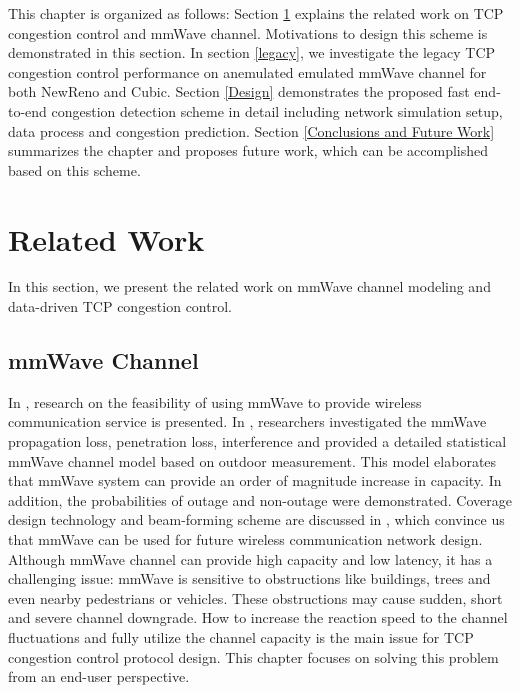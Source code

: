 \par This chapter is organized as follows: Section \ref{Related Work and Motivations} explains the related work on TCP congestion control and mmWave channel. Motivations to design this scheme is demonstrated in this section. In section \ref{legacy}, we investigate the legacy TCP congestion control performance on anemulated emulated mmWave channel for both NewReno and Cubic. Section \ref{Design} demonstrates the proposed fast end-to-end congestion detection scheme in detail including network simulation setup, data process and congestion prediction. Section \ref{Conclusions and Future Work} summarizes the chapter and proposes future work, which can be accomplished based on this scheme.

\section{Related Work}
\label{Related Work and Motivations}
In this section, we present the related work on mmWave channel modeling and data-driven TCP congestion control.  
\subsection{mmWave Channel}
\par In \cite{niu2015survey}\cite{rappaport2013millimeter}, research on the feasibility of using mmWave to provide wireless communication service is presented. In \cite{akdeniz2014millimeter}, researchers investigated the mmWave propagation loss, penetration loss, interference and provided a detailed statistical mmWave channel model based on outdoor measurement. This model elaborates that mmWave system can provide an order of magnitude increase in capacity. In addition, the probabilities of outage and non-outage were demonstrated. Coverage design technology and beam-forming scheme are discussed in\cite{sun2014millimeter} \cite{roh2014millimeter}, which convince us that mmWave can be used for future wireless communication network design. Although mmWave channel can provide high capacity and low latency, it has a challenging issue: mmWave is sensitive to obstructions like buildings, trees and even nearby pedestrians or vehicles. These obstructions may cause sudden, short and severe channel downgrade. How to increase the reaction speed to the channel fluctuations and fully utilize the channel capacity is the main issue for TCP congestion control protocol design. This chapter focuses on solving this problem from an end-user perspective.


